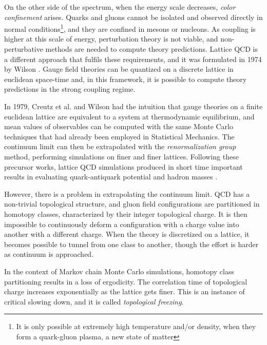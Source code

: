 On the other side of the spectrum, when the energy scale decreases, \emph{color confinement} arises.
Quarks and gluons cannot be isolated and observed directly in normal conditions\footnote{It is only possible at extremely high temperature and/or density, when they form a quark-gluon plasma, a new state of matter},
and they are confined in mesons or nucleons.
As coupling is higher at this scale of energy, perturbation theory is not viable, and non-perturbative methods are needed to compute theory predictions.
Lattice QCD is a different approach that fulfils these requirements, and it was formulated in 1974 by Wilson \cite{wilson:1974}.
Gauge field theories can be quantized on a discrete lattice in euclidean space-time and,
in this framework, it is possible to compute theory predictions in the strong coupling regime.

In 1979, Creutz et al.\@ \cite{creutz:1979} and Wilson \cite{wilson:1980}
had the intuition that gauge theories on a finite euclidean lattice are equivalent to a system at thermodynamic equilibrium,
and mean values of observables can be computed with the same Monte Carlo techniques that had already been employed in Statistical Mechanics.
The continuum limit can then be extrapolated with the \emph{renormalization group} method, performing simulations on finer and finer lattices.
Following these precursor works, lattice QCD simulations produced in short time important results in evaluating quark-antiquark potential and hadron masses
\cite{creutz:1980, hamber-parisi:1981, weingarten:1982}.

However, there is a problem in extrapolating the continuum limit.
QCD has a non-trivial topological structure, and gluon field configurations are partitioned in homotopy classes, characterized by their integer topological charge.
It is then impossible to continuously deform a configuration with a charge value into another with a different charge.
When the theory is discretized on a lattice, it becomes possible to tunnel from one class to another,
though the effort is harder as continuum is approached.

In the context of Markov chain Monte Carlo simulations, homotopy class partitioning results in a loss of ergodicity.
The correlation time of topological charge increases exponentially as the lattice gets finer.
This is an instance of critical slowing down, and it is called \emph{topological freezing}.

